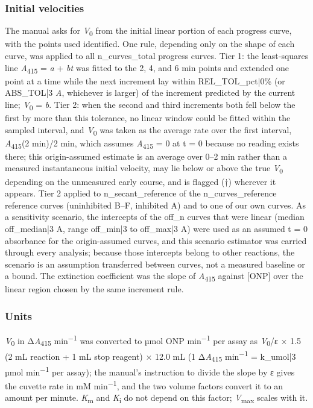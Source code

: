 \documentclass[9pt,twocolumn]{extarticle}
\newcommand{\Km}{\textit{K}\textsubscript{m}}
\newcommand{\Vmax}{\textit{V}\textsubscript{max}}
\newcommand{\Vo}{\textit{V}\textsubscript{0}}
\newcommand{\Ki}{\textit{K}\textsubscript{i}}
\newcommand{\Aa}{\textit{A}\textsubscript{415}}
\newcommand{\dAa}{Δ\textit{A}\textsubscript{415}}
\newcommand{\permin}{min\textsuperscript{−1}}
\newcommand{\umolmin}{µmol min\textsuperscript{−1}}
\newcommand{\dash}{–}
\begin{document}
\subsubsection{Initial velocities}
The manual asks for \Vo{} from the initial linear portion of each progress curve, with the points used identified. One rule, depending only on the shape of each curve, was applied to all {{n_curves_total}} progress curves. Tier 1: the least-squares line \Aa{} = \textit{a} + \textit{bt} was fitted to the 2, 4, and 6 min points and extended one point at a time while the next increment lay within {{REL_TOL_pct|0}}\% (or {{ABS_TOL|3}} \textit{A}, whichever is larger) of the increment predicted by the current line; \Vo{} = \textit{b}. Tier 2: when the second and third increments both fell below the first by more than this tolerance, no linear window could be fitted within the sampled interval, and \Vo{} was taken as the average rate over the first interval, \Aa(2 min)/2 min, which assumes \Aa{} = 0 at t = 0 because no reading exists there; this origin-assumed estimate is an average over 0\dash 2 min rather than a measured instantaneous initial velocity, may lie below or above the true \Vo{} depending on the unmeasured early course, and is flagged (†) wherever it appears. Tier 2 applied to {{n_secant_reference}} of the {{n_curves_reference}} reference curves (uninhibited B\dash F, inhibited A) and to one of our own curves. As a sensitivity scenario, the intercepts of the {{off_n}} curves that were linear (median {{off_median|3}} A, range {{off_min|3}} to {{off_max|3}} A) were used as an assumed t = 0 absorbance for the origin-assumed curves, and this scenario estimator was carried through every analysis; because those intercepts belong to other reactions, the scenario is an assumption transferred between curves, not a measured baseline or a bound. The extinction coefficient was the slope of \Aa{} against [ONP] over the linear region chosen by the same increment rule.
\subsubsection{Units}
\Vo{} in \dAa{} \permin{} was converted to µmol ONP \permin{} per assay as \Vo/ε × 1.5 (2 mL reaction + 1 mL stop reagent) × 12.0 mL (1 \dAa{} \permin{} = {{k_umol|3}} \umolmin{} per assay); the manual's instruction to divide the slope by ε gives the cuvette rate in mM \permin, and the two volume factors convert it to an amount per minute. \Km{} and \Ki{} do not depend on this factor; \Vmax{} scales with it.
\end{document}
